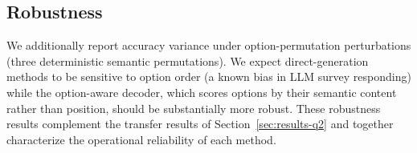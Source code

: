 \subsection{Robustness}
\label{sec:results-robust}

We additionally report accuracy variance under option-permutation perturbations (three deterministic semantic permutations). We expect direct-generation methods to be sensitive to option order (a known bias in LLM survey responding) while the option-aware decoder, which scores options by their semantic content rather than position, should be substantially more robust. These robustness results complement the transfer results of Section~\ref{sec:results-q2} and together characterize the operational reliability of each method.
